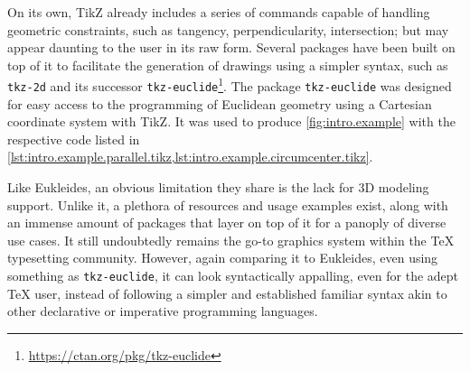 On its own, \ac{TikZ} already includes a series of commands capable of handling
geometric constraints, such as tangency, perpendicularity, intersection; but may
appear daunting to the user in its raw form.  Several packages have been built
on top of it to facilitate the generation of drawings using a simpler syntax,
such as \texttt{tkz-2d} and its successor
\texttt{tkz-euclide}\footnote{\url{https://ctan.org/pkg/tkz-euclide}}.  The
package \texttt{tkz-euclide} was designed for easy access to the programming of
Euclidean geometry using a Cartesian coordinate system with \ac{TikZ}.  It was
used to produce \cref{fig:intro.example} with the respective code listed in
\cref{lst:intro.example.parallel.tikz,lst:intro.example.circumcenter.tikz}.

Like Eukleides, an obvious limitation they share is the lack for 3D modeling
support.  Unlike it, a plethora of resources and usage examples exist, along
with an immense amount of packages that layer on top of it for a panoply of
diverse use cases.  It still undoubtedly remains the go-to graphics system
within the \TeX{} typesetting community.  However, again comparing it to
Eukleides, even using something as \texttt{tkz-euclide}, it can look
syntactically appalling, even for the adept \TeX{} user, instead of following a
simpler and established familiar syntax akin to other declarative or imperative
programming languages.
